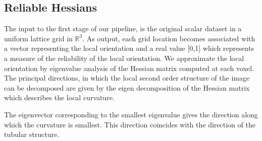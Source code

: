 \subsection {Reliable Hessians}
\label{subsec:rh}

The input to the first stage of our pipeline, is the original scalar dataset  in a uniform lattice grid in $\mathbb{R}^3$. As output, each grid location becomes associated with a vector representing the local orientation and a real value [0,1] which represents a measure of the reliability of the local orientation. 
We approximate the local orientation by eigenvalue analysis of the Hessian matrix computed at each voxel. The principal directions, in which the local second order structure of the image can be decomposed are given by the eigen decomposition of the Hessian matrix which describes the local curvature.

The eigenvector corresponding to the smallest eigenvalue gives the direction along which the curvature is smallest. This direction coincides with the direction of the tubular structure.


